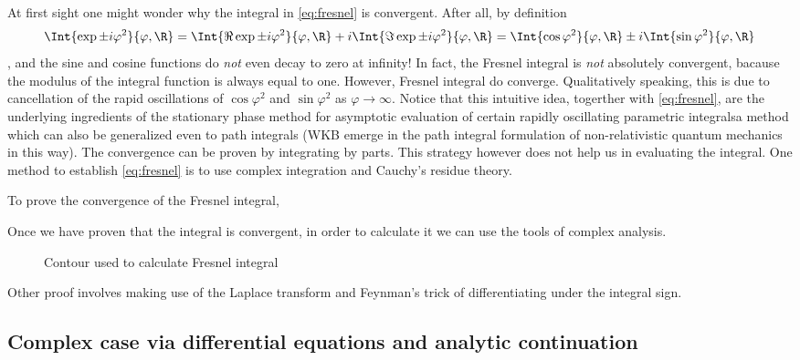 At first sight one might wonder why the integral in \cref{eq:fresnel} is convergent.
After all, 
by definition
\begin{dmath*}
   \Int{ \exp{\pm i\varphi^{2}}}{\varphi,\R} 
   = 
   \Int{ \Re \exp{\pm i\varphi^{2}}}{\varphi,\R} + i 
   \Int{ \Im \exp{\pm i\varphi^{2}}}{\varphi,\R} 
   = 
   \Int{ \cos{\varphi^{2}}}{\varphi,\R} \pm i 
   \Int{ \sin{\varphi^{2}}}{\varphi,\R} 
\end{dmath*},
and the sine and cosine functions do \emph{not} even decay to zero at infinity!
In fact, the Fresnel integral is \emph{not} absolutely
convergent, bacause the modulus of the integral function is always equal to
one. However, Fresnel integral do converge.
Qualitatively speaking, this is due to cancellation of the rapid oscillations of $\cos
\varphi^{2}$ and $\sin\varphi^{2}$ as $\varphi\rightarrow\infty$.
Notice that this intuitive idea, togerther with 
\cref{eq:fresnel}, are the underlying ingredients of the stationary phase method for
asymptotic evaluation of certain rapidly oscillating parametric
integrals\textemdash a
method which can also be generalized even to path integrals (WKB emerge in the path
integral formulation of non-relativistic quantum mechanics in this
way).
The convergence can be proven by integrating by parts. This
strategy however does not help us in evaluating the integral.
One method to establish \cref{eq:fresnel} is to use complex integration and
Cauchy's residue theory.

To prove  the convergence of the Fresnel integral, 

Once we have proven that the integral is convergent, in order to calculate it
we can use the tools of complex analysis.

\begin{figure}
   \caption{Contour used to calculate Fresnel integral
      \label{fig:fresnel}}
\end{figure}

Other proof  involves making use of the
Laplace transform and Feynman's trick of differentiating under the integral
sign.



\subsection{Complex case via differential equations and analytic continuation} 
\label{sec:complex case}

